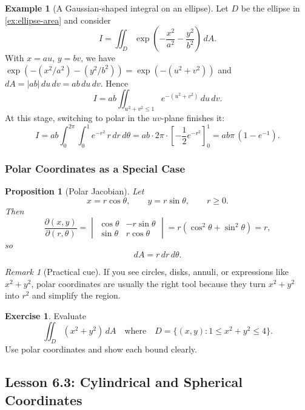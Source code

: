 \documentclass[12pt]{article}
\numberwithin{equation}{section}
\theoremstyle{plain}
\newtheorem{proposition}[theorem]{Proposition}
\theoremstyle{definition}
\newtheorem{example}[theorem]{Example}
\newtheorem{exercise}[theorem]{Exercise}
\theoremstyle{remark}
\newtheorem{remark}[theorem]{Remark}
\begin{document}
\begin{example}[A Gaussian-shaped integral on an ellipse]\label{ex:ellipse-gaussian}
Let $D$ be the ellipse in \cref{ex:ellipse-area} and consider
\[
I=\iint_D \exp\!\left(-\frac{x^2}{a^2}-\frac{y^2}{b^2}\right)\,dA.
\]
With $x=au$, $y=bv$, we have $\exp(-(x^2/a^2)-(y^2/b^2))=\exp(-(u^2+v^2))$ and $dA=|ab|\,du\,dv=ab\,du\,dv$. Hence
\[
I=ab\iint_{u^2+v^2\le 1} e^{-(u^2+v^2)}\,du\,dv.
\]
At this stage, switching to polar in the $uv$-plane finishes it:
\[
I=ab\int_{0}^{2\pi}\int_{0}^{1} e^{-r^2}\,r\,dr\,d\theta
=ab\cdot 2\pi \cdot \left[-\frac12 e^{-r^2}\right]_{0}^{1}
=ab\pi\,(1-e^{-1}).
\]
\end{example}

\subsubsection{Polar Coordinates as a Special Case}

\begin{proposition}[Polar Jacobian]\label{prop:polar-jac}
Let
\[
x=r\cos\theta,\qquad y=r\sin\theta,\qquad r\ge 0.
\]
Then
\[
\frac{\partial(x,y)}{\partial(r,\theta)}
=
\begin{vmatrix}
\cos\theta & -r\sin\theta\\
\sin\theta & r\cos\theta
\end{vmatrix}
=r(\cos^2\theta+\sin^2\theta)=r,
\]
so
\begin{equation}\label{eq:polar-area-element}
dA=r\,dr\,d\theta.
\end{equation}
\end{proposition}

\begin{remark}[Practical cue]
If you see circles, disks, annuli, or expressions like $x^2+y^2$, polar coordinates are usually the right tool because they turn $x^2+y^2$ into $r^2$ and simplify the region.
\end{remark}

\begin{exercise}
Evaluate
\[
\iint_D (x^2+y^2)\,dA
\quad\text{where}\quad
D=\{(x,y):1\le x^2+y^2\le 4\}.
\]
Use polar coordinates and show each bound clearly.
\end{exercise}

\subsection{Lesson 6.3: Cylindrical and Spherical Coordinates}
\end{document}
